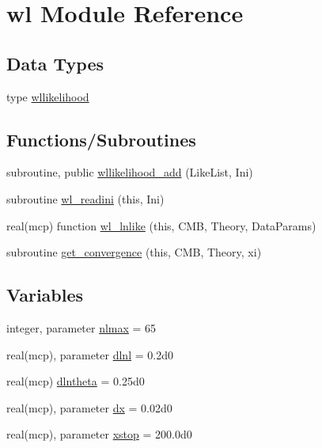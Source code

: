 \hypertarget{namespacewl}{}\section{wl Module Reference}
\label{namespacewl}
\subsection*{Data Types}
\begin{DoxyCompactItemize}
\item 
type \mbox{\hyperlink{structwl_1_1wllikelihood}{wllikelihood}}
\end{DoxyCompactItemize}
\subsection*{Functions/\+Subroutines}
\begin{DoxyCompactItemize}
\item 
subroutine, public \mbox{\hyperlink{namespacewl_a622c1e8033fcc6aa3474f2fd57263f4b}{wllikelihood\+\_\+add}} (Like\+List, Ini)
\item 
subroutine \mbox{\hyperlink{namespacewl_ae5eb8a620a32ecf00fb98f6d7f2e5573}{wl\+\_\+readini}} (this, Ini)
\item 
real(mcp) function \mbox{\hyperlink{namespacewl_ae6b71112cf916069d3fc83f99af9168c}{wl\+\_\+lnlike}} (this, C\+MB, Theory, Data\+Params)
\item 
subroutine \mbox{\hyperlink{namespacewl_a1238699402e6cd69190706ee7bf42356}{get\+\_\+convergence}} (this, C\+MB, Theory, xi)
\end{DoxyCompactItemize}
\subsection*{Variables}
\begin{DoxyCompactItemize}
\item 
integer, parameter \mbox{\hyperlink{namespacewl_afc642e4e15f4400cf7729c68be5aa85d}{nlmax}} = 65
\item 
real(mcp), parameter \mbox{\hyperlink{namespacewl_a3359e7d1e42c8d0976460988d6f1f095}{dlnl}} = 0.\+2d0
\item 
real(mcp) \mbox{\hyperlink{namespacewl_a1747377f03b9869d4c2736ecc5c83300}{dlntheta}} = 0.\+25d0
\item 
real(mcp), parameter \mbox{\hyperlink{namespacewl_af91a3d13d635d84de880af213be86336}{dx}} = 0.\+02d0
\item 
real(mcp), parameter \mbox{\hyperlink{namespacewl_a908028e399897f9b001a61a6f78b6349}{xstop}} = 200.\+0d0
\end{DoxyCompactItemize}


